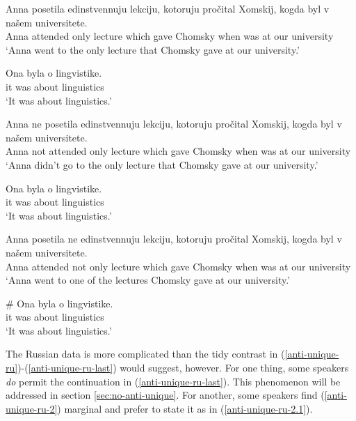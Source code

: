 \documentclass{article}
\begin{document}
\begin{exe}
	\ex \label{anti-unique-ru} \begin{xlist}
		\ex \gll Anna posetila edinstvennuju lekciju, kotoruju pro\v{c}ital Xomskij, kogda byl v na\v{s}em universitete.\\
		Anna attended only lecture which gave Chomsky when was at our university\\
		\glt `Anna went to the only lecture that Chomsky gave at our university.'
		
		\ex \gll Ona byla o lingvistike.\\
		it was about linguistics\\
		\glt `It was about linguistics.'
	\end{xlist}
	
	\ex \label{anti-unique-ru-2} \begin{xlist}
		\ex \gll Anna ne posetila edinstvennuju lekciju, kotoruju pro\v{c}ital Xomskij, kogda byl v na\v{s}em universitete.\\
		Anna not attended only lecture which gave Chomsky when was at our university\\
		\glt `Anna didn't go to the only lecture that Chomsky gave at our university.'
		
		\ex \gll Ona byla o lingvistike.\\
		it was about linguistics\\
		\glt `It was about linguistics.'
	\end{xlist}
	
	\ex \label{anti-unique-ru-last} \begin{xlist} 
		\ex \gll Anna posetila ne edinstvennuju lekciju, kotoruju pro\v{c}ital Xomskij, kogda byl v na\v{s}em universitete.\\
		Anna attended not only lecture which gave Chomsky when was at our university\\
		\glt `Anna went to one of the lectures Chomsky gave at our university.'
		
		\ex \gll \# Ona byla o lingvistike.\\
		{} it was about linguistics\\
		\glt `It was about linguistics.'
	\end{xlist}
\end{exe}

The Russian data is more complicated than the tidy contrast in (\ref{anti-unique-ru})-(\ref{anti-unique-ru-last}) would suggest, however. For one thing, some speakers \textit{do} permit the continuation in (\ref{anti-unique-ru-last}). This phenomenon will be addressed in section \ref{sec:no-anti-unique}. For another, some speakers find (\ref{anti-unique-ru-2}) marginal and prefer to state it as in (\ref{anti-unique-ru-2.1}).
\end{document}

